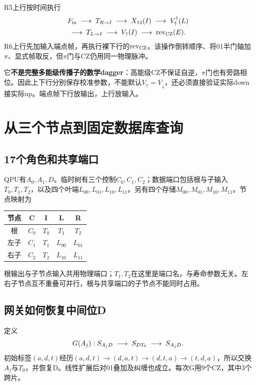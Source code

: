 R5上行按时间执行
\begin{equation}\label{eq:r5up}
\begin{aligned}
 &F_{\rm in}\;\longrightarrow\; T_{R\to I}\;\longrightarrow\; X_{12}(I)\;\longrightarrow\; V_{\uparrow}^{\dagger}(L)\\
 &\;\longrightarrow\; T_{L\to I}\;\longrightarrow\; V_{\uparrow}(I)\;\longrightarrow\;\operatorname{rev}_{\mathrm{CZ}}(E).
\end{aligned}
\end{equation}
R6上行先加输入端点帧，再执行裸下行的$\operatorname{rev}_{\mathrm{CZ}}$。该操作倒转顺序、将01半门轴加$\pi$、显式帧取反，但$\pi$门与CZ仍用同一物理脉冲。

它\textbf{不是完整多能级传播子的数学dagger}：高能级CZ不保证自逆，$\pi$门也有旁路相位。因此上下行分别保存校准参数，不能默认$V_{\uparrow}=V_{\downarrow}$，还必须直接验证实际down接实际up。端点帧下行放输出，上行放输入。
\FloatBarrier

\section{从三个节点到固定数据库查询}\label{sec:query}
\subsection{17个角色和共享端口}
QPU有$A_0,A_1,D$。临时树有三个控制$C_0,C_1,C_2$；数据端口包括根与子输入$T_0,T_1,T_2$，以及四个叶端$L_{00},L_{01},L_{10},L_{11}$。另有四个存储$M_{00},M_{01},M_{10},M_{11}$。节点映射为
\begin{center}\small\begin{tabular}{@{}ccccc@{}}\toprule
节点&C&I&L&R\\\midrule
根&$C_0$&$T_0$&$T_1$&$T_2$\\左子&$C_1$&$T_1$&$L_{00}$&$L_{01}$\\右子&$C_2$&$T_2$&$L_{10}$&$L_{11}$\\\bottomrule
\end{tabular}\end{center}
根输出与子节点输入共用物理端口；$T_1,T_2$在这里是端口名，与寿命参数无关。左右子节点互不重叠可并行，根与共享端口的子节点不能同时占用。

\subsection{网关如何恢复中间位D}
定义
\begin{equation}
 G(A_j):S_{A_jD}\;\longrightarrow\; S_{DT_0}\;\longrightarrow\; S_{A_jD}.
\end{equation}
初始标签$(a,d,t)$经历$(a,d,t)\to(d,a,t)\to(d,t,a)\to(t,d,a)$，所以交换$A_j$与$T_0$，并恢复D。线性扩展后对01叠加及纠缠也成立。每次G用9个CZ，其中3个跨片。

